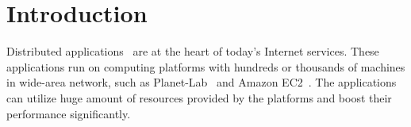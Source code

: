 \section{Introduction}


Distributed applications~\cite{Ghemawat2003, DeCandia2007}
are at the heart of today's Internet services. These
applications run on computing platforms with hundreds or
thousands of machines in wide-area network, such as
Planet-Lab~\cite{Bavier2004} and Amazon
EC2~\cite{Garfinkel2007}. The applications can utilize huge
amount of resources provided by the platforms and boost
their performance significantly.








